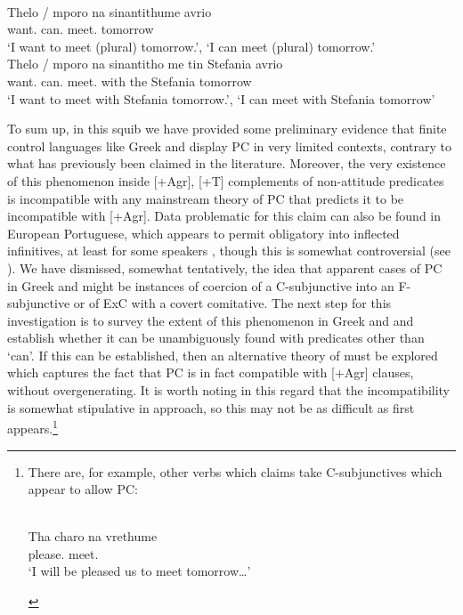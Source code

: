 \documentclass[output=paper]{langsci/langscibook}
\begin{document}
\ea%
    \label{ex:24.54}\\
	\gll Thelo / mporo    na   sinantithume   avrio\\
        want.\Fsg{} {} can.\Fsg{}  \Sbjv{}   meet.\Fsg{}   tomorrow\\
	\glt ‘I want to meet (plural) tomorrow.’, ‘I can meet (plural) tomorrow.’
\ex%
    \label{ex:24.55}\\
	\gll Thelo  / mporo   na   sinantitho   me tin Stefania   avrio\\
    want.\Fsg{} {}  can.\Fsg{} \Sbjv{}  meet.\Fsg{}   with the Stefania   tomorrow\\
	\glt ‘I want to meet with Stefania tomorrow.’, ‘I can meet with Stefania tomorrow’
\z\largerpage[3]

To sum up, in this squib we have provided some preliminary evidence that finite
control languages like Greek and  display \gls{PC} in very limited contexts, contrary to what has previously been claimed
in the literature. Moreover, the very existence of this phenomenon inside
[+Agr], [+T] complements of non-attitude predicates is incompatible with any
mainstream theory of \gls{PC} that predicts it to
be incompatible with [+Agr]. Data problematic for this claim can also be found
in European Portuguese, which appears to permit obligatory  into
inflected infinitives, at least for some speakers
\parencite{Sheehan2018a,Sheehan2018b},
though this is somewhat controversial (see \citealt{Barbosa2017}). We have
dismissed, somewhat tentatively, the idea that apparent cases of
\gls{PC} in Greek and  might be instances
of coercion of a C-subjunctive into an F-subjunctive or of
\gls{ExC} with a covert comitative. The next
step for this investigation is to survey the extent of this phenomenon in Greek
and  and establish whether it can be unambiguously found with
predicates other than ‘can’. If this can be established, then an alternative
theory of  must be explored which captures the fact that
\gls{PC} is in fact compatible with [+Agr] clauses,
without overgenerating. It is worth noting in this regard that the
incompatibility is somewhat stipulative in  approach, so
this may not be as difficult as first appears.{\footnote{There are, for example,
    other verbs which \citeauthor{Varlokosta1994} claims take C-subjunctives
    which appear to allow \gls{PC}:

\begin{exe}
     \\
    \gll Tha charo     na   vrethume \\
    \Fut{} please.\Fsg{}   \Sbjv{} meet.\Fpl{}\\
    \glt ‘I will be pleased us to meet tomorrow\dots{}’
\end{exe}}}\pagebreak

\printchapterglossary{}

{\sloppy
\printbibliography[heading=subbibliography,notkeyword=this]
}
\end{document}
